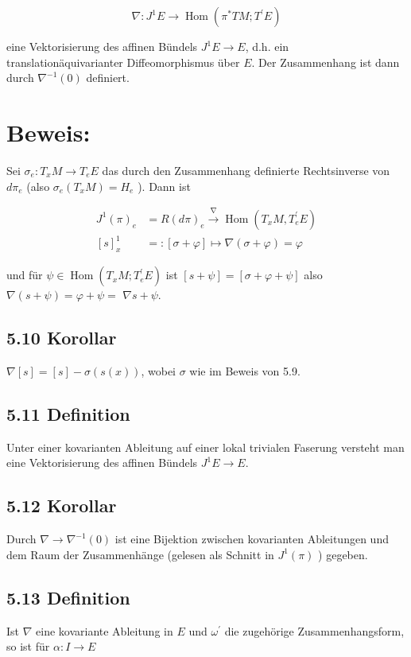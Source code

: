 \documentclass[10pt, letterpaper]{article}
\begin{document}
$$
\nabla: J^{1} E \rightarrow \operatorname{Hom}\left(\pi^{*} T M ; T^{\prime} E\right)
$$

eine Vektorisierung des affinen Bündels $J^{1} E \rightarrow E$, d.h. ein translationäquivarianter Diffeomorphismus über $E$. Der Zusammenhang ist dann durch $\nabla^{-1}(0)$ definiert.

\section*{Beweis:}
Sei $\sigma_{e}: T_{x} M \rightarrow T_{e} E$ das durch den Zusammenhang definierte Rechtsinverse von $d \pi_{e}$ (also $\sigma_{e}\left(T_{x} M\right)=H_{e}$ ). Dann ist

$$
\begin{aligned}
J^{1}(\pi)_{e} & =R(d \pi)_{e} \xrightarrow{\nabla} \operatorname{Hom}\left(T_{x} M, T_{e}^{\prime} E\right) \\
{[s]_{x}^{1} } & =:[\sigma+\varphi] \mapsto \nabla(\sigma+\varphi)=\varphi
\end{aligned}
$$

und für $\psi \in \operatorname{Hom}\left(T_{x} M ; T_{e}^{\prime} E\right)$ ist $[s+\psi]=[\sigma+\varphi+\psi]$ also $\nabla(s+\psi)=\varphi+\psi=$ $\nabla s+\psi$.

\subsection*{5.10 Korollar}
$\nabla[s]=[s]-\sigma(s(x))$, wobei $\sigma$ wie im Beweis von 5.9.

\subsection*{5.11 Definition}
Unter einer kovarianten Ableitung auf einer lokal trivialen Faserung versteht man eine Vektorisierung des affinen Bündels $J^{1} E \rightarrow E$.

\subsection*{5.12 Korollar}
Durch $\nabla \rightarrow \nabla^{-1}(0)$ ist eine Bijektion zwischen kovarianten Ableitungen und dem Raum der Zusammenhänge (gelesen als Schnitt in $J^{1}(\pi)$ ) gegeben.

\subsection*{5.13 Definition}
Ist $\nabla$ eine kovariante Ableitung in $E$ und $\omega^{\prime}$ die zugehörige Zusammenhangsform, so ist für $\alpha: I \rightarrow E$
\end{document}
